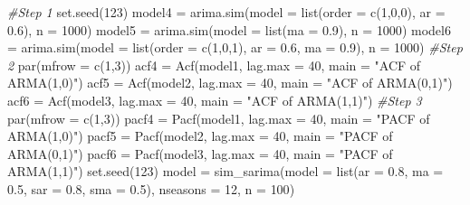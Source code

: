 \documentclass[
]{article}
\newenvironment{Shaded}{\begin{snugshade}}{\end{snugshade}}
\newcommand{\AttributeTok}[1]{\textcolor[rgb]{0.77,0.63,0.00}{#1}}
\newcommand{\CommentTok}[1]{\textcolor[rgb]{0.56,0.35,0.01}{\textit{#1}}}
\newcommand{\DecValTok}[1]{\textcolor[rgb]{0.00,0.00,0.81}{#1}}
\newcommand{\FloatTok}[1]{\textcolor[rgb]{0.00,0.00,0.81}{#1}}
\newcommand{\FunctionTok}[1]{\textcolor[rgb]{0.00,0.00,0.00}{#1}}
\newcommand{\NormalTok}[1]{#1}
\newcommand{\OtherTok}[1]{\textcolor[rgb]{0.56,0.35,0.01}{#1}}
\newcommand{\StringTok}[1]{\textcolor[rgb]{0.31,0.60,0.02}{#1}}
\begin{document}
\begin{Shaded}
\begin{Highlighting}[]
\CommentTok{\#Step 1}
\FunctionTok{set.seed}\NormalTok{(}\DecValTok{123}\NormalTok{)}
\NormalTok{model4 }\OtherTok{=} \FunctionTok{arima.sim}\NormalTok{(}\AttributeTok{model =} \FunctionTok{list}\NormalTok{(}\AttributeTok{order =} \FunctionTok{c}\NormalTok{(}\DecValTok{1}\NormalTok{,}\DecValTok{0}\NormalTok{,}\DecValTok{0}\NormalTok{), }\AttributeTok{ar =} \FloatTok{0.6}\NormalTok{), }\AttributeTok{n =} \DecValTok{1000}\NormalTok{)}
\NormalTok{model5 }\OtherTok{=} \FunctionTok{arima.sim}\NormalTok{(}\AttributeTok{model =} \FunctionTok{list}\NormalTok{(}\AttributeTok{ma =} \FloatTok{0.9}\NormalTok{), }\AttributeTok{n =} \DecValTok{1000}\NormalTok{)}
\NormalTok{model6 }\OtherTok{=} \FunctionTok{arima.sim}\NormalTok{(}\AttributeTok{model =} \FunctionTok{list}\NormalTok{(}\AttributeTok{order =} \FunctionTok{c}\NormalTok{(}\DecValTok{1}\NormalTok{,}\DecValTok{0}\NormalTok{,}\DecValTok{1}\NormalTok{), }\AttributeTok{ar =} \FloatTok{0.6}\NormalTok{, }\AttributeTok{ma =} \FloatTok{0.9}\NormalTok{), }\AttributeTok{n =} \DecValTok{1000}\NormalTok{)}
\CommentTok{\#Step 2}
\FunctionTok{par}\NormalTok{(}\AttributeTok{mfrow =} \FunctionTok{c}\NormalTok{(}\DecValTok{1}\NormalTok{,}\DecValTok{3}\NormalTok{))}
\NormalTok{acf4 }\OtherTok{=} \FunctionTok{Acf}\NormalTok{(model1, }\AttributeTok{lag.max =} \DecValTok{40}\NormalTok{, }\AttributeTok{main =} \StringTok{"ACF of ARMA(1,0)"}\NormalTok{)}
\NormalTok{acf5 }\OtherTok{=} \FunctionTok{Acf}\NormalTok{(model2, }\AttributeTok{lag.max =} \DecValTok{40}\NormalTok{, }\AttributeTok{main =} \StringTok{"ACF of ARMA(0,1)"}\NormalTok{)}
\NormalTok{acf6 }\OtherTok{=} \FunctionTok{Acf}\NormalTok{(model3, }\AttributeTok{lag.max =} \DecValTok{40}\NormalTok{, }\AttributeTok{main =} \StringTok{"ACF of ARMA(1,1)"}\NormalTok{)}
\CommentTok{\#Step 3}
\FunctionTok{par}\NormalTok{(}\AttributeTok{mfrow =} \FunctionTok{c}\NormalTok{(}\DecValTok{1}\NormalTok{,}\DecValTok{3}\NormalTok{))}
\NormalTok{pacf4 }\OtherTok{=} \FunctionTok{Pacf}\NormalTok{(model1, }\AttributeTok{lag.max =} \DecValTok{40}\NormalTok{, }\AttributeTok{main =} \StringTok{"PACF of ARMA(1,0)"}\NormalTok{)}
\NormalTok{pacf5 }\OtherTok{=} \FunctionTok{Pacf}\NormalTok{(model2, }\AttributeTok{lag.max =} \DecValTok{40}\NormalTok{, }\AttributeTok{main =} \StringTok{"PACF of ARMA(0,1)"}\NormalTok{)}
\NormalTok{pacf6 }\OtherTok{=} \FunctionTok{Pacf}\NormalTok{(model3, }\AttributeTok{lag.max =} \DecValTok{40}\NormalTok{, }\AttributeTok{main =} \StringTok{"PACF of ARMA(1,1)"}\NormalTok{)}
\FunctionTok{set.seed}\NormalTok{(}\DecValTok{123}\NormalTok{)}
\NormalTok{model }\OtherTok{=} \FunctionTok{sim\_sarima}\NormalTok{(}\AttributeTok{model =} \FunctionTok{list}\NormalTok{(}\AttributeTok{ar =} \FloatTok{0.8}\NormalTok{, }\AttributeTok{ma =} \FloatTok{0.5}\NormalTok{, }\AttributeTok{sar =} \FloatTok{0.8}\NormalTok{, }\AttributeTok{sma =} \FloatTok{0.5}\NormalTok{), }
                   \AttributeTok{nseasons =} \DecValTok{12}\NormalTok{, }\AttributeTok{n =} \DecValTok{100}\NormalTok{)}


\end{Highlighting}
\end{Shaded}
\end{document}
